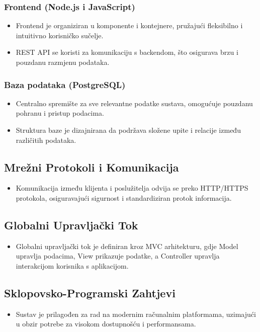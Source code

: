 \subsubsection*{Frontend (Node.js i JavaScript)}
\begin{itemize}
    \item Frontend je organiziran u komponente i kontejnere, pružajući fleksibilno i intuitivno korisničko sučelje.
    \item REST API se koristi za komunikaciju s backendom, što osigurava brzu i pouzdanu razmjenu podataka.
\end{itemize}

\subsubsection*{Baza podataka (PostgreSQL)}
\begin{itemize}
    \item Centralno spremište za sve relevantne podatke sustava, omogućuje pouzdanu pohranu i pristup podacima.
    \item Struktura baze je dizajnirana da podržava složene upite i relacije između različitih podataka.
\end{itemize}

\subsection*{Mrežni Protokoli i Komunikacija}
\begin{itemize}
    \item Komunikacija između klijenta i poslužitelja odvija se preko HTTP/HTTPS protokola, osiguravajući sigurnost i standardiziran protok informacija.
\end{itemize}

\subsection*{Globalni Upravljački Tok}
\begin{itemize}
    \item Globalni upravljački tok je definiran kroz MVC arhitekturu, gdje Model upravlja podacima, View prikazuje podatke, a Controller upravlja interakcijom korisnika s aplikacijom.
\end{itemize}

\subsection*{Sklopovsko-Programski Zahtjevi}
\begin{itemize}
    \item Sustav je prilagođen za rad na modernim računalnim platformama, uzimajući u obzir potrebe za visokom dostupnošću i performansama.
\end{itemize}

